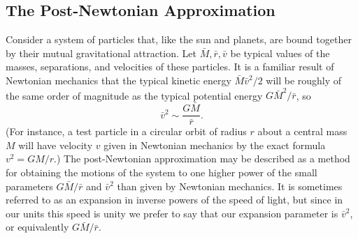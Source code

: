 %

\subsection{The Post-Newtonian Approximation}\label{sec:9.1}

Consider a system of particles that, like the sun and planets, are bound
together by their mutual gravitational attraction. Let
\(\bar M,\bar r,\bar v\) be typical values of the masses, separations, and
velocities of these particles. It is a familiar result of Newtonian mechanics
that the typical kinetic energy \(\bar M\bar v^2/2\) will be roughly of the
same order of magnitude as the typical potential energy
\(G\bar M^2/\bar r\), so
\begin{equation}
  \bar v^2\sim\frac{G\bar M}{\bar r}.
  \tag{9.1.1}\label{eq:9.1.1}
\end{equation}
(For instance, a test particle in a circular orbit of radius \(r\) about a
central mass \(M\) will have velocity \(v\) given in Newtonian mechanics by
the exact formula \(v^2=GM/r\).) The post-Newtonian approximation may be
described as a method for obtaining the motions of the system to one higher
power of the small parameters \(G\bar M/\bar r\) and \(\bar v^2\) than given
by Newtonian mechanics. It is sometimes referred to as an expansion in
inverse powers of the speed of light, but since in our units this speed is
unity we prefer to say that our expansion parameter is \(\bar v^2\), or
equivalently \(G\bar M/\bar r\).

